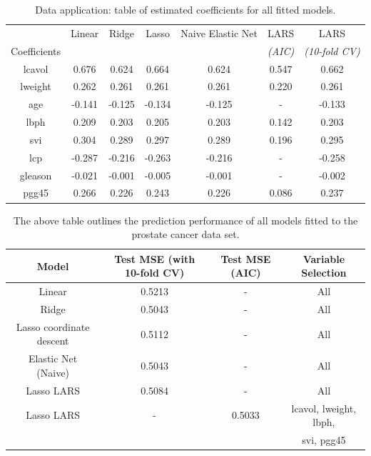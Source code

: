 \begin{table}[H]
\centering
\begin{tabular}{||c c c c c c c||} 
 \hline
  & Linear & Ridge & Lasso & Naive Elastic Net & LARS  & LARS  \\ [0.5ex] 
  Coefficients & & & & & \emph{(AIC)} & \emph{(10-fold CV)}\\ [0.5ex]
 \hline\hline
 lcavol & 0.676 & 0.624 & 0.664 & 0.624 & 0.547 & 0.662\\
 \hline
 lweight & 0.262 &  0.261 & 0.261 & 0.261 &  0.220 & 0.261\\
 \hline
 age & -0.141 & -0.125 & -0.134 & -0.125 & - & -0.133\\
\hline
 lbph & 0.209 & 0.203 & 0.205 & 0.203 & 0.142 & 0.203\\
\hline
 svi & 0.304 & 0.289 & 0.297 & 0.289 & 0.196 & 0.295\\
\hline
 lcp & -0.287 & -0.216 & -0.263 & -0.216 & - & -0.258\\
 \hline
 gleason & -0.021 & -0.001 & -0.005 & -0.001 & - & -0.002\\
 \hline
 pgg45 & 0.266 & 0.226 & 0.243 & 0.226 & 0.086 & 0.237\\
 \hline
\end{tabular}
\caption[Data application: table of estimated coefficients for all fitted models]{Data application: table of estimated coefficients for all fitted models.}
\label{tab:coef_table}
\end{table}

    
\begin{table}[H]
\centering
\begin{tabular}{||c c c c||} 
 \hline
 Model & Test MSE (with 10-fold CV) & Test MSE (AIC) & Variable Selection\\ [0.5ex] 
 \hline\hline
 Linear & 0.5213 & - & All\\ 
 \hline
 Ridge & 0.5043 & - & All\\
 \hline
 Lasso coordinate descent & 0.5112 & - & All\\
 \hline
 Elastic Net (Naive) & 0.5043 & - & All\\
 \hline
  Lasso LARS & 0.5084 & - & All\\
 \hline
 Lasso LARS & - & 0.5033 & lcavol, lweight, lbph, \\ & & & svi, pgg45\\
 \hline
\end{tabular}
\caption[Data application: model selection]{The above table outlines the prediction performance of all models fitted to the prostate cancer data set.}
\label{tab:mod_sel}
\end{table}

